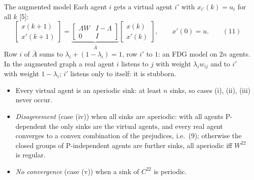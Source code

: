 \begin{frame}[label=bk-augmented]{The augmented model}
  \small
  Each agent $i$ gets a virtual agent $i'$ with $x_{i'}(k) = u_i$ for all $k$ [5]:
  \[
    \begin{bmatrix} x(k+1) \\ x'(k+1) \end{bmatrix}
    = \underbrace{\begin{bmatrix} \Lambda W & I - \Lambda \\ 0 & I \end{bmatrix}}_{\bar A}
      \begin{bmatrix} x(k) \\ x'(k) \end{bmatrix},
    \qquad x'(0) = u . \qquad (11)
  \]
  Row $i$ of $\bar A$ sums to $\lambda_i + (1 - \lambda_i) = 1$, row $i'$ to $1$: an FDG
  model on $2n$ agents. In the augmented graph a real agent $i$ listens to $j$ with weight
  $\lambda_i w_{ij}$ and to $i'$ with weight $1 - \lambda_i$; $i'$ listens only to itself:
  it is stubborn.
  \begin{itemize}
    \item Every virtual agent is an aperiodic sink: at least $n$ sinks, so cases (i),
          (ii), (iii) never occur.
    \item \emph{Disagreement} (case (iv)) when all sinks are aperiodic: with all agents
          P-dependent the only sinks are the virtual agents, and every real agent converges
          to a convex combination of the prejudices, i.e.\ (9); otherwise the closed groups
          of P-independent agents are further sinks, all aperiodic iff $W^{22}$ is regular.
    \item \emph{No convergence} (case (v)) when a sink of $C^{22}$ is periodic.
  \end{itemize}
\end{frame}

